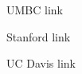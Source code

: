 \documentclass[paper=a4, fontsize=11pt]{scrartcl}
\numberwithin{equation}{section}		%
\numberwithin{figure}{section}			%
\numberwithin{table}{section}				%
\begin{document}
\clearpage

\begin{thebibliography}{1}

 UMBC link

 Stanford link

 UC Davis link

\end{thebibliography}

\end{document}

